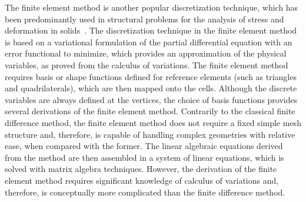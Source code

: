 The finite element method is another popular discretization technique, which has been predominantly used in structural problems for the analysis of stress and deformation in solids~\cite{chap1:1993reddy,chap1:2004ern,chap1:2005chen,chap1:2005zienkiewicza,chap1:2005zienkiewiczb}.
The discretization technique in the finite element method is based on a variational formulation of the partial differential equation with an error functional to minimize, which provides an approximation of the physical variables, as proved from the calculus of variations.
The finite element method requires basis or shape functions defined for reference elements (such as triangles and quadrilaterals), which are then mapped onto the cells.
Although the discrete variables are always defined at the vertices, the choice of basis functions provides several derivations of the finite element method.
Contrarily to the classical finite difference method, the finite element method does not require a fixed simple mesh structure and, therefore, is capable of handling complex geometries with relative ease, when compared with the former.
The linear algebraic equations derived from the method are then assembled in a system of linear equations, which is solved with matrix algebra techniques.
However, the derivation of the finite element method requires significant knowledge of calculus of variations and, therefore, is conceptually more complicated than the finite difference method.


